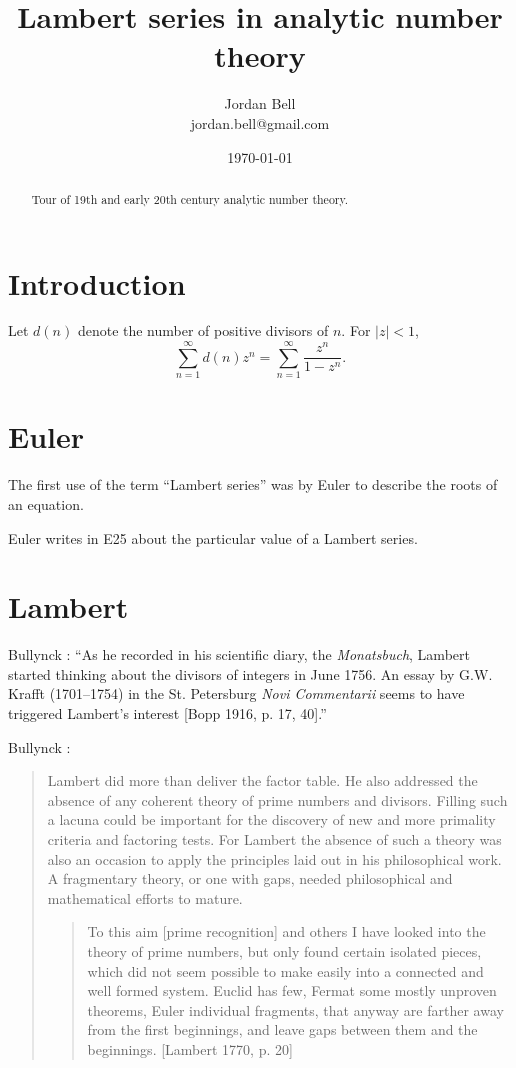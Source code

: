 \documentclass{article}
\begin{document}
\title{Lambert series in analytic number theory}
\author{Jordan Bell \\
jordan.bell@gmail.com}
\date{\today}




\maketitle
\begin{abstract}
Tour of 19th and early 20th century analytic number theory.
\end{abstract}



\section{Introduction}
Let $d(n)$ denote the number of positive divisors of $n$. 
For $|z|<1$,
\[
\sum_{n=1}^\infty d(n) z^n = \sum_{n=1}^\infty \frac{z^n}{1-z^n}.
\]


\section{Euler}
The first use of the term ``Lambert series'' was by Euler to describe the roots of an equation.
 
Euler writes in E25 \cite{E25} about the particular value of a Lambert series.



\section{Lambert}
Bullynck \cite[pp.~157--158]{bullynck}: ``As he recorded in his scientific diary,
the {\em Monatsbuch}, Lambert started
thinking about the divisors of integers in June 1756. An essay by G.W.
Krafft (1701–1754) in the St. Petersburg {\em Novi Commentarii} seems to have
triggered Lambert's interest [Bopp 1916, p. 17, 40].''

Bullynck \cite[p.~163]{bullynck}:

\begin{quote}
Lambert did more than deliver the factor table. He also addressed the
	absence of any coherent theory of prime numbers and divisors. Filling
	such a lacuna could be important for the discovery of new and more primality criteria and
	factoring tests. For Lambert the absence of such a theory was also an occasion to apply the principles
	laid
	out in his philosophical
	work. A fragmentary theory, or one with gaps, needed philosophical and
	mathematical efforts to mature.
	
	\begin{quote}
		To this aim [prime recognition] and others I have looked into the theory
		of prime numbers, but only found certain isolated pieces, which did not seem
		possible to make easily into a connected and well formed system. Euclid has
		few, Fermat some mostly unproven theorems, Euler individual fragments, that
		anyway are farther away from the first beginnings, and leave gaps between them
		and the beginnings. [Lambert 1770, p. 20]
		\end{quote}
\end{quote}
\end{document}

